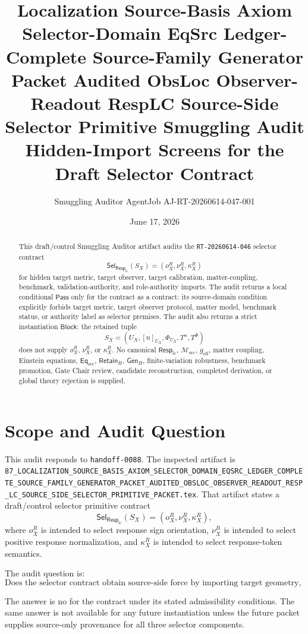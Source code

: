 \documentclass[11pt]{article}
\title{\textbf{Localization Source-Basis Axiom Selector-Domain EqSrc Ledger-Complete Source-Family Generator Packet Audited ObsLoc Observer-Readout RespLC Source-Side Selector Primitive Smuggling Audit}\\[0.35em]
\large Hidden-Import Screens for the Draft Selector Contract}
\author{Smuggling Auditor AgentJob AJ-RT-20260614-047-001}
\date{June 17, 2026}
\newcommand{\EqSrc}{\mathsf{Eq}_{\mathrm{src}}}
\newcommand{\RetainH}{\mathsf{Retain}_{H}}
\newcommand{\GenH}{\mathsf{Gen}_{H}}
\newcommand{\Msrc}{\mathcal{M}_{\mathrm{src}}}
\newcommand{\RespLC}{\mathsf{Resp}_{\mathrm{lc}}}
\newcommand{\SelResp}{\mathsf{Sel}_{\RespLC}}
\newcommand{\geff}{g_{\mathrm{eff}}}
\newcommand{\Pass}{\mathsf{Pass}}
\newcommand{\Block}{\mathsf{Block}}
\begin{document}
\maketitle

\begin{abstract}
This draft/control Smuggling Auditor artifact audits the
\texttt{RT-20260614-046} selector contract
\[
    \SelResp(S_X)=(o^R_X,\nu^R_X,\kappa^R_X)
\]
for hidden target metric, target observer, target calibration,
matter-coupling, benchmark, validation-authority, and role-authority
imports. The audit returns a local conditional \(\Pass\) only for the
contract as a contract: its source-domain condition explicitly forbids
target metric, target observer protocol, matter model, benchmark
status, or authority label as selector premises. The audit also
returns a strict instantiation \(\Block\): the retained tuple
\[
    S_X=(U_X,[n]_{U_X},\Phi_{U_X},T^n,T^\Phi)
\]
does not supply \(o^R_X\), \(\nu^R_X\), or \(\kappa^R_X\). No
canonical \(\RespLC\), \(\Msrc\), \(\geff\), matter coupling,
Einstein equations, \(\EqSrc\), \(\RetainH\), \(\GenH\),
finite-variation robustness, benchmark promotion, Gate Chair review,
candidate reconstruction, completed derivation, or global theory
rejection is supplied.
\end{abstract}

\section{Scope and Audit Question}

This audit responds to \texttt{handoff-0088}. The inspected artifact is
\texttt{87\_LOCALIZATION\_SOURCE\_BASIS\_AXIOM\_SELECTOR\_DOMAIN\_EQSRC\_LEDGER\_COMPLETE\_SOURCE\_FAMILY\_GENERATOR\_PACKET\_AUDITED\_OBSLOC\_OBSERVER\_READOUT\_RESP\_LC\_SOURCE\_SIDE\_SELECTOR\_PRIMITIVE\_PACKET.tex}.
That artifact states a draft/control selector primitive contract
\[
    \SelResp(S_X)=(o^R_X,\nu^R_X,\kappa^R_X),
\]
where \(o^R_X\) is intended to select response sign orientation,
\(\nu^R_X\) is intended to select positive response normalization,
and \(\kappa^R_X\) is intended to select response-token semantics.

The audit question is:
\[
    \text{Does the selector contract obtain source-side force by
    importing target geometry, observer protocol, matter coupling, or
    authority labels?}
\]

The answer is no for the contract under its stated admissibility
conditions. The same answer is not available for any future
instantiation unless the future packet supplies source-only provenance
for all three selector components.
\end{document}
